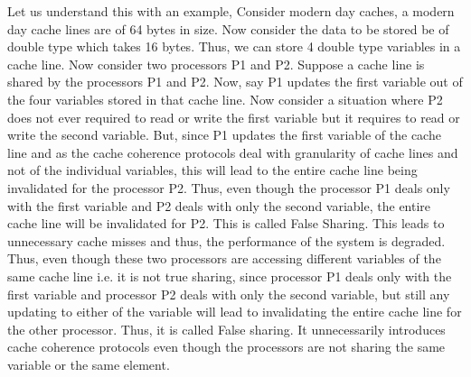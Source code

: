 \documentclass[12pt]{book}
\begin{document}
Let us understand this with an example, Consider modern day caches, a modern day cache lines are of 64 bytes in size. 
Now consider the data to be stored be of double type which takes 16 bytes. Thus, we can store 4 double type variables in a cache line.
Now consider two processors P1 and P2. Suppose a cache line is shared by the processors P1 and P2. 
Now, say P1 updates the first variable out of the four variables stored in that cache line. Now consider a situation 
where P2 does not ever required to read or write the first variable but it requires to read or write the second variable.
But, since P1 updates the first variable of the cache line and as the cache coherence protocols deal with granularity of cache lines and not
of the individual variables, this will lead to the entire cache line being invalidated for the processor P2. Thus, even though the processor P1 deals only with the first variable and P2 deals with only the second variable,
the entire cache line will be invalidated for P2. This is called False Sharing. This leads to unnecessary cache misses and thus, the performance of the system is degraded. Thus, even though these two processors are accessing different variables of the same cache line
i.e. it is not true sharing, since processor P1 deals only with the first variable and processor P2 deals with only the second variable, but still any updating to either of the variable will lead to invalidating the entire cache line for the other processor. 
Thus, it is called False sharing. It unnecessarily introduces cache coherence protocols even though the processors are not sharing the same variable or the same element.

\newpage
\end{document}
